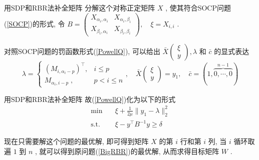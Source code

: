 \documentclass[slidestop,compress,mathserif,UTF8]{beamer}
\numberwithin{equation}{section}                                %
\begin{document}
            \begin{frame}[t]{用SDP和RBR法补全矩阵}
                分解这个对称正定矩阵 $X$ , 使其符合SOCP问题(\ref{SOCP})的形式, 令
                $
                        B 
                    =	\begin{pmatrix}
                            X_{\alpha_i, \alpha_i} & X_{\alpha_i, \beta_i} \\
                            X_{\beta_i, \alpha_i} & X_{\beta_i, \beta_i}
                        \end{pmatrix} ,\quad 
                        \xi
                    =	X_{i, i}
                $ .
                
                对照SOCP问题的罚函数形式(\ref{PowellQ}), 可以给出 $\bar{X} \begin{pmatrix}\xi \\ y\end{pmatrix}, \lambda$ 和 $\bar{c}$ 的显式表达
                \begin{equation}\label{BigRBRCondition2}
                        \lambda
                    = 	\begin{cases}
                            (M_{i,\alpha_i-p})^\top,&i\leq p\\
                            M_{\alpha_i,i-p}\;,&p<i\leq n
                        \end{cases}
                        , \quad
                        \bar{X} \begin{pmatrix} \xi \\ y \end{pmatrix}
                    =	y_1
                        , \quad
                        \bar{c}
                    =	(1, \overbrace{0, \cdots, 0}^{n - 1})
                \end{equation}
            \end{frame}
            \begin{frame}[t]{用SDP和RBR法补全矩阵}
                故(\ref{PowellQ})化为以下的形式
                \begin{equation}
                    \begin{split}\label{TrueRBRQ}
                        \min \quad
                            & \xi + \frac{1}{2\mu} \lVert{y_1 - \lambda}\rVert^2_2\\
                        \text{s.t.} \quad
                            & \xi - y^\top B^{-1} y \geq \delta
                    \end{split}
                \end{equation}

                现在只需要解这个问题的最优解, 即可得到矩阵 $X$ 的第 $i$ 行和第 $i$ 列, 当 $i$ 循环取遍 $1$ 到 $n$ , 就可以得到原问题(\ref{BigRBR})的最优解, 从而求得目标矩阵 $W$ .
            \end{frame}
\end{document}
